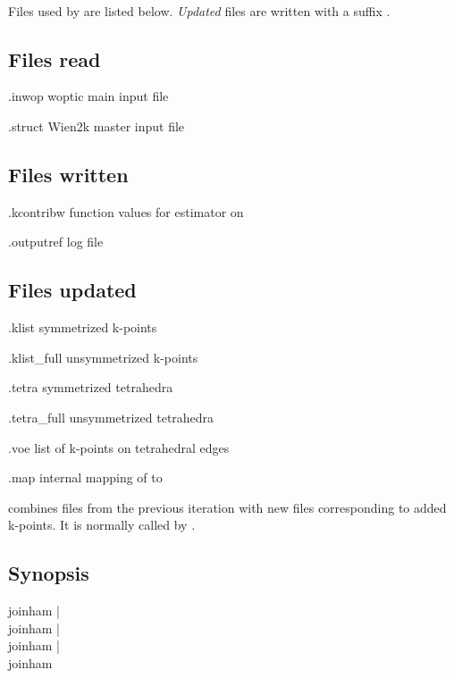 \paragraph{} Files used by  are listed below.  \emph{Updated}
files are written with a suffix .

\subsection{Files read}
\begin{options}
\item[\case.inwop] woptic main input file
\item[\case.struct] Wien2k master input file
\end{options}

\subsection{Files written}
\begin{options}
\item[\case.kcontribw] function values for estimator on
\item[\case.outputref] log file
\end{options}

\subsection{Files updated}
\begin{options}
\item[\case.klist] symmetrized k-points
\item[\case.klist\_full] unsymmetrized k-points
\item[\case.tetra] symmetrized tetrahedra
\item[\case.tetra\_full] unsymmetrized tetrahedra
\item[\case.voe] list of k-points on tetrahedral edges
\item[\case.map] internal mapping of  to
\end{options}



\joinham combines  files from the previous iteration with
new files corresponding to added k-points.  It is normally called by
\woprog.

\subsection{Synopsis}
\begin{usage}
  joinham \case                                      |\\
  joinham                  |\\
  joinham      |\\
  joinham      
            
\end{usage}

